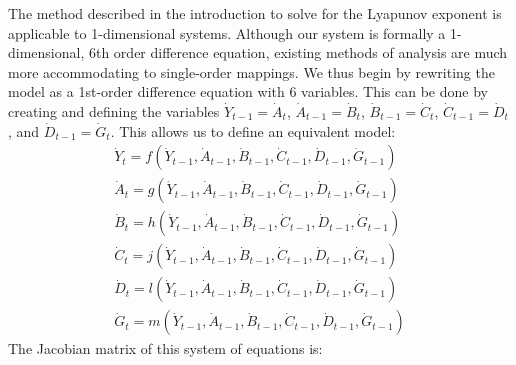 The method described in the introduction to solve for the Lyapunov exponent is applicable to 1-dimensional systems. Although our system is formally a 1-dimensional, 6th order difference equation, existing methods of analysis are much more accommodating to single-order mappings. We thus begin by rewriting the model as a 1st-order difference equation with 6 variables. This can be done by creating and defining the variables $\dot Y_{t-1}=\dot A_t$, $\dot A_{t-1}=\dot B_{t}$, $\dot B_{t-1}=\dot C_{t}$, $\dot C_{t-1}=\dot D_{t}$, and $\dot D_{t-1}=\dot G_{t}$. This allows us to define an equivalent model:
\begin{align*}
    \dot Y_t = f(\dot Y_{t-1}, \dot A_{t-1}, \dot B_{t-1}, \dot C_{t-1}, \dot D_{t-1}, \dot G_{t-1})\\
    \dot A_t = g(\dot Y_{t-1}, \dot A_{t-1}, \dot B_{t-1}, \dot C_{t-1}, \dot D_{t-1}, \dot G_{t-1})\\
    \dot B_t = h(\dot Y_{t-1}, \dot A_{t-1}, \dot B_{t-1}, \dot C_{t-1}, \dot D_{t-1}, \dot G_{t-1})\\
    \dot C_t = j(\dot Y_{t-1}, \dot A_{t-1}, \dot B_{t-1}, \dot C_{t-1}, \dot D_{t-1}, \dot G_{t-1})\\
    \dot D_t = l(\dot Y_{t-1}, \dot A_{t-1}, \dot B_{t-1}, \dot C_{t-1}, \dot D_{t-1}, \dot G_{t-1})\\
    \dot G_t = m(\dot Y_{t-1}, \dot A_{t-1}, \dot B_{t-1}, \dot C_{t-1}, \dot D_{t-1}, \dot G_{t-1})
\end{align*}
The Jacobian matrix of this system of equations is:
